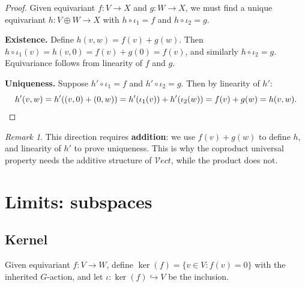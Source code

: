 \documentclass[12pt,a4paper]{article}
\theoremstyle{definition}
\theoremstyle{remark}
\newtheorem{remark}[theorem]{Remark}
\newcommand{\Vect}{\mathcal{V}\!\mathit{ect}}
\begin{document}
\begin{proof}
Given equivariant $f\colon V \to X$ and $g\colon W \to X$, we must find a unique
equivariant $h\colon V \oplus W \to X$ with $h \circ \iota_1 = f$ and
$h \circ \iota_2 = g$.

\medskip
\begin{center}
\end{center}

\textbf{Existence.} Define $h(v,w) = f(v) + g(w)$. Then $h \circ \iota_1(v) =
h(v,0) = f(v) + g(0) = f(v)$, and similarly $h \circ \iota_2 = g$. Equivariance
follows from linearity of $f$ and $g$.

\textbf{Uniqueness.} Suppose $h' \circ \iota_1 = f$ and $h' \circ \iota_2 = g$.
Then by linearity of $h'$:
\[
h'(v,w) = h'((v,0) + (0,w)) = h'(\iota_1(v)) + h'(\iota_2(w)) = f(v) + g(w) = h(v,w). \qedhere
\]
\end{proof}

\begin{remark}
This direction requires \textbf{addition}: we use $f(v) + g(w)$ to define $h$, and
linearity of $h'$ to prove uniqueness. This is why the coproduct universal property
needs the additive structure of $\Vect$, while the product does not.
\end{remark}

\section{Limits: subspaces}

\subsection{Kernel}

Given equivariant $f\colon V \to W$, define
$\ker(f) = \{v \in V : f(v) = 0\}$ with the inherited $G$-action, and let
$\iota\colon \ker(f) \hookrightarrow V$ be the inclusion.

\medskip
\begin{center}
\end{center}
\end{document}
